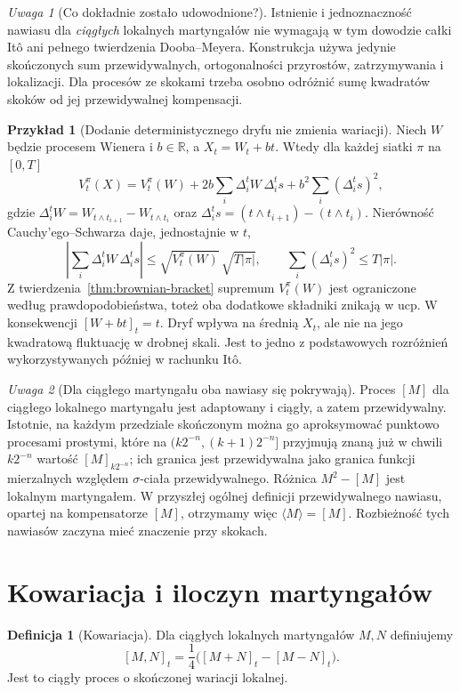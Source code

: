 \documentclass[11pt,a4paper,oneside]{report}
\numberwithin{equation}{chapter}
\theoremstyle{plain}
\theoremstyle{definition}
\newtheorem{definicja}{Definicja}[chapter]
\newtheorem{przyklad}{Przykład}[chapter]
\theoremstyle{remark}
\newtheorem{uwaga}{Uwaga}[chapter]
\newcommand{\R}{\mathbb{R}}
\begin{document}
\begin{uwaga}[Co dokładnie zostało udowodnione?]
Istnienie i jednoznaczność nawiasu dla \emph{ciągłych}
lokalnych martyngałów nie wymagają w tym dowodzie
całki Itô ani pełnego twierdzenia Dooba--Meyera.
Konstrukcja używa jedynie skończonych sum przewidywalnych,
ortogonalności przyrostów, zatrzymywania i lokalizacji.
Dla procesów ze skokami trzeba osobno odróżnić sumę
kwadratów skoków od jej przewidywalnej kompensacji.
\end{uwaga}


\begin{przyklad}[Dodanie deterministycznego dryfu nie zmienia wariacji]
Niech $W$ będzie procesem Wienera i $b\in\R$, a
$X_t=W_t+bt$. Wtedy dla każdej siatki $\pi$ na $[0,T]$
\[
V_t^\pi(X)=V_t^\pi(W)
 +2b\sum_i\Delta_i^tW\,\Delta_i^t s
 +b^2\sum_i(\Delta_i^t s)^2,
\]
gdzie $\Delta_i^tW=W_{t\wedge t_{i+1}}-W_{t\wedge t_i}$
oraz $\Delta_i^t s=(t\wedge t_{i+1})-(t\wedge t_i)$.
Nierówność Cauchy'ego--Schwarza daje, jednostajnie w $t$,
\[
\left|\sum_i\Delta_i^tW\,\Delta_i^t s\right|
\le \sqrt{V_t^\pi(W)}\,\sqrt{T|\pi|},\qquad
\sum_i(\Delta_i^t s)^2\le T|\pi|.
\]
Z twierdzenia~\ref{thm:brownian-bracket} supremum $V_t^\pi(W)$
jest ograniczone według prawdopodobieństwa, toteż oba dodatkowe
składniki znikają w ucp. W konsekwencji $[W+bt]_t=t$.
Dryf wpływa na średnią $X_t$, ale nie na jego kwadratową
fluktuację w drobnej skali. Jest to jedno z podstawowych
rozróżnień wykorzystywanych później w rachunku It\^o.
\end{przyklad}

\begin{uwaga}[Dla ciągłego martyngału oba nawiasy się pokrywają]
Proces $[M]$ dla ciągłego lokalnego martyngału jest adaptowany
i ciągły, a zatem przewidywalny. Istotnie, na każdym przedziale
skończonym można go aproksymować punktowo procesami prostymi,
które na $(k2^{-n},(k+1)2^{-n}]$ przyjmują znaną już w chwili
$k2^{-n}$ wartość $[M]_{k2^{-n}}$; ich granica jest
przewidywalna jako granica funkcji mierzalnych względem
$\sigma$-ciała przewidywalnego. Różnica $M^2-[M]$
jest lokalnym martyngałem. W przyszłej ogólnej definicji
przewidywalnego nawiasu, opartej na kompensatorze $[M]$,
otrzymamy więc $\langle M\rangle=[M]$.
Rozbieżność tych nawiasów zaczyna mieć znaczenie przy skokach.
\end{uwaga}


\section{Kowariacja i iloczyn martyngałów}
\begin{definicja}[Kowariacja]
Dla ciągłych lokalnych martyngałów $M,N$ definiujemy
\[
[M,N]_t=\frac14\bigl([M+N]_t-[M-N]_t\bigr).
\]
Jest to ciągły proces o skończonej wariacji lokalnej.
\end{definicja}
\end{document}
